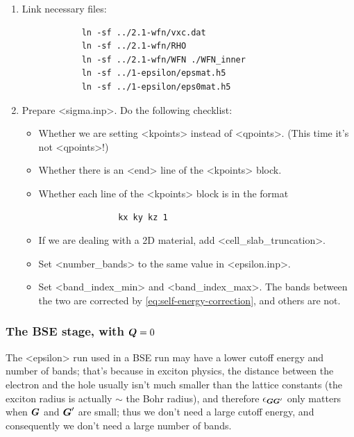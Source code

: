 \documentclass[hyperref, a4paper, 12pt]{report}
\def\texttt#1{<#1>}%
\newcommand{\shortcode}[1]{\texttt{#1}}
\begin{document}
\begin{enumerate}
\begin{enumerate}
        \item Link necessary files:
        \begin{lstlisting}
            ln -sf ../2.1-wfn/vxc.dat 
            ln -sf ../2.1-wfn/RHO 
            ln -sf ../2.1-wfn/WFN ./WFN_inner
            ln -sf ../1-epsilon/epsmat.h5 
            ln -sf ../1-epsilon/eps0mat.h5 
        \end{lstlisting}
        \item Prepare \shortcode{sigma.inp}. Do the following checklist:
        \begin{itemize}
            \item Whether we are setting \shortcode{kpoints} instead of \shortcode{qpoints}.
            (This time it's not \shortcode{qpoints}!)
            \item Whether there is an \shortcode{end} line of the \shortcode{kpoints} block.
            \item Whether each line of the \shortcode{kpoints} block is in the format
            \begin{lstlisting}
                kx ky kz 1
            \end{lstlisting}
            \item If we are dealing with a 2D material, add \shortcode{cell_slab_truncation}.
            \item Set \shortcode{number_bands} to the same value in \shortcode{epsilon.inp}.
            \item Set \shortcode{band_index_min} and \shortcode{band_index_max}.
            The bands between the two are corrected by \eqref{eq:self-energy-correction},
            and others are not.
        \end{itemize}
    \end{enumerate}
\end{enumerate}

\subsubsection{The BSE stage, with $\vb*{Q} = 0$}

The \shortcode{epsilon} run used in a BSE run may have a lower cutoff energy and number of bands;
that's because in exciton physics, the distance between the electron and the hole 
usually isn't much smaller than the lattice constants
(the exciton radius is actually $\sim$ the Bohr radius), 
and therefore $\epsilon_{\vb*{G} \vb*{G}'}$ only matters when $\vb*{G}$ and $\vb*{G}'$ are small; 
thus we don't need a large cutoff energy, 
and consequently we don't need a large number of bands. 
\end{document}
